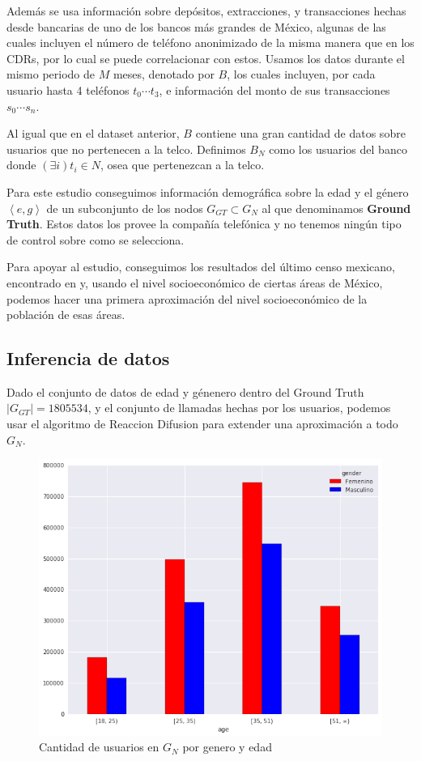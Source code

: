 \documentclass[
10pt,
spanish,
singlespacing, %
parskip, %
headsepline, %
twocolumn
]{article} %
\begin{document}
Además se usa información sobre depósitos, extracciones, y transacciones hechas desde bancarias de uno de los bancos más grandes de México, algunas de las cuales incluyen el número de teléfono anonimizado de la misma manera que en los CDRs, por lo cual se puede correlacionar con estos. Usamos los datos durante el mismo periodo de \( M \) meses, denotado por \( B \), los cuales incluyen, por cada usuario hasta 4 teléfonos \( t_0 \cdots t_3 \), e información del monto de sus transacciones \( s_0 \cdots s_n \).

Al igual que en el dataset anterior, \( B \) contiene una gran cantidad de datos sobre usuarios que no pertenecen a la telco. Definimos \( B_N \) como los usuarios del banco donde \( \left( \exists i \right) t_i \in N \), osea que pertenezcan a la telco.

Para este estudio conseguimos información demográfica sobre la edad y el género \( \left<e, g\right> \) de un subconjunto de los nodos \( G_{GT} \subset G_N \) al que denominamos \textbf{Ground Truth}. Estos datos los provee la compañía telefónica y no tenemos ningún tipo de control sobre como se selecciona.

Para apoyar al estudio, conseguimos los resultados del último censo mexicano, encontrado en  y, usando el nivel socioeconómico de ciertas áreas de México, podemos hacer una primera aproximación del nivel socioeconómico de la población de esas áreas.

\subsection*{Inferencia de datos}

Dado el conjunto de datos de edad y génenero dentro del Ground Truth \( \left|G_{GT}\right| = 1805534 \), y el conjunto de llamadas hechas por los usuarios, podemos usar el algoritmo de Reaccion Difusion \cite{reactiondiffusion} para extender una aproximación a todo \( G_N \).

\begin{figure}
\center
\includegraphics[width=\columnwidth]{Figures/gender_age_bar}
\caption{Cantidad de usuarios en \( G_N \) por genero y edad}
\end{figure}
\end{document}
